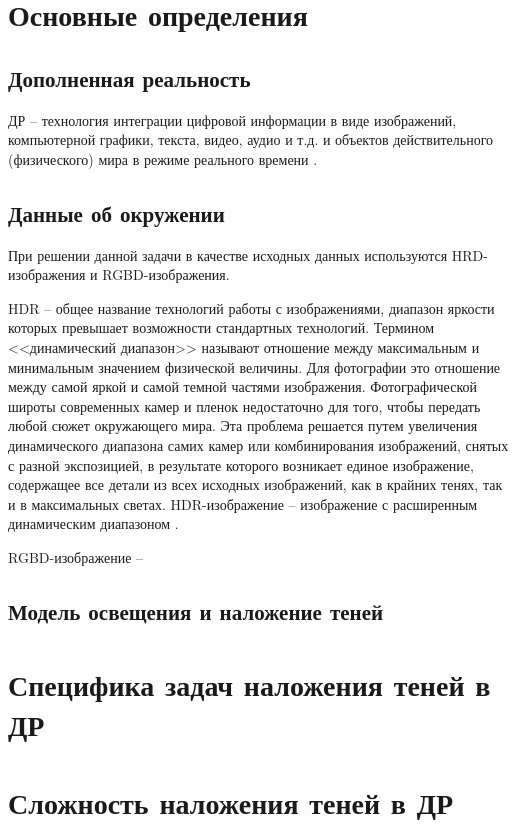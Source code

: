 \section{Основные определения}

\subsection{Дополненная реальность}

ДР -- технология интеграции цифровой информации в виде изображений, компьютерной графики, текста, видео, аудио и т.д. и объектов действительного (физического) мира в режиме реального времени \cite{tech-ar}.


\subsection{Данные об окружении}


При решении данной задачи в качестве исходных данных используются HRD-изображения и RGBD-изображения.

HDR -- общее название технологий работы с изображениями, диапазон яркости которых превышает возможности стандартных технологий. Термином <<динамический диапазон>> называют отношение между максимальным и минимальным значением физической величины. Для фотографии это отношение между самой яркой и самой темной частями изображения. Фотографической широты современных камер и пленок недостаточно для того, чтобы передать любой сюжет окружающего мира. Эта проблема решается путем увеличения динамического диапазона самих камер или комбинирования изображений, снятых с разной экспозицией, в результате которого возникает единое изображение, содержащее все детали из всех исходных изображений, как в крайних тенях, так и в максимальных светах. HDR-изображение -- изображение с расширенным динамическим диапазоном \cite{hdri}.

RGBD-изображение -- 

\subsection{Модель освещения и наложение теней}



\section{Специфика задач наложения теней в ДР}



\section{Сложность наложения теней в ДР}


